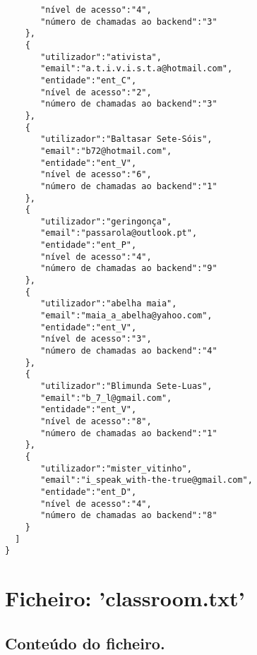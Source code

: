 \documentclass[11pt,a4paper]{report}%
\begin{document}
\begin{verbatim}
       "nível de acesso":"4",
       "número de chamadas ao backend":"3"
    },
    {
       "utilizador":"ativista",
       "email":"a.t.i.v.i.s.t.a@hotmail.com",
       "entidade":"ent_C",
       "nível de acesso":"2",
       "número de chamadas ao backend":"3"
    },
    {
       "utilizador":"Baltasar Sete-Sóis",
       "email":"b72@hotmail.com",
       "entidade":"ent_V",
       "nível de acesso":"6",
       "número de chamadas ao backend":"1"
    },
    {
       "utilizador":"geringonça",
       "email":"passarola@outlook.pt",
       "entidade":"ent_P",
       "nível de acesso":"4",
       "número de chamadas ao backend":"9"
    },
    {
       "utilizador":"abelha maia",
       "email":"maia_a_abelha@yahoo.com",
       "entidade":"ent_V",
       "nível de acesso":"3",
       "número de chamadas ao backend":"4"
    },
    {
       "utilizador":"Blimunda Sete-Luas",
       "email":"b_7_l@gmail.com",
       "entidade":"ent_V",
       "nível de acesso":"8",
       "número de chamadas ao backend":"1"
    },
    {
       "utilizador":"mister_vitinho",
       "email":"i_speak_with-the-true@gmail.com",
       "entidade":"ent_D",
       "nível de acesso":"4",
       "número de chamadas ao backend":"8"
    }
  ]
}
\end{verbatim}

\section{Ficheiro: 'classroom.txt'}
\subsection{Conteúdo do ficheiro.}
\end{document}

